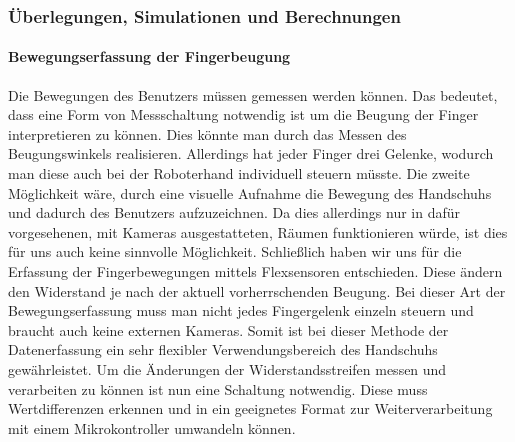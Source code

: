 \documentclass[titlepage,12pt,twoside]{article}
\begin{document}
\subsubsection{Überlegungen, Simulationen und Berechnungen}
\label{chap:Überlegungen, Simulationen und Berechnungen}
\paragraph{Bewegungserfassung der Fingerbeugung}
\hfill \break
\hfill \break
Die Bewegungen des Benutzers müssen gemessen werden können. Das bedeutet, dass eine Form von Messschaltung notwendig ist um die  
Beugung der Finger interpretieren zu können. Dies könnte man durch das Messen des Beugungswinkels realisieren. Allerdings hat 
jeder Finger drei Gelenke, wodurch man diese auch bei der Roboterhand individuell steuern müsste. Die zweite Möglichkeit wäre, 
durch eine visuelle Aufnahme die Bewegung des Handschuhs und dadurch des Benutzers aufzuzeichnen. Da dies allerdings nur in dafür vorgesehenen, 
mit Kameras ausgestatteten, Räumen funktionieren würde, ist dies für uns auch keine sinnvolle Möglichkeit. Schließlich haben 
wir uns für die Erfassung der Fingerbewegungen mittels Flexsensoren entschieden. Diese ändern den Widerstand je nach der 
aktuell vorherrschenden Beugung. Bei dieser Art der Bewegungserfassung muss man nicht jedes Fingergelenk einzeln steuern und 
braucht auch keine externen Kameras. Somit ist bei dieser Methode der Datenerfassung ein sehr flexibler Verwendungsbereich 
des Handschuhs gewährleistet. Um die Änderungen der Widerstandsstreifen messen und verarbeiten zu können ist nun eine Schaltung 
notwendig. Diese muss Wertdifferenzen erkennen und in ein geeignetes Format zur Weiterverarbeitung mit einem Mikrokontroller
umwandeln können. \\
\\
\end{document}
